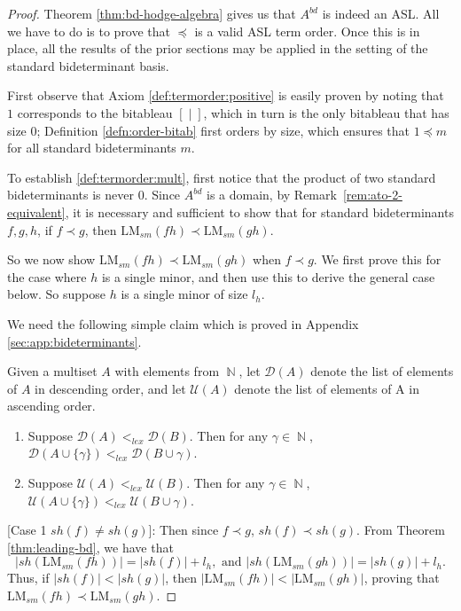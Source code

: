 \documentclass[11pt,reqno]{amsart}
\DeclareMathOperator{\N}{\mathbb{N}}
\newcommand{\bitab}[2]{[#1\;|\;#2]}
\newcommand{\lmsm}{\text{LM}_{sm}}
\newcommand{\shapebitab}{sh}
\newcommand{\sizetab}[1]{|#1|}
\theoremstyle{definition}
\numberwithin{equation}{section}
\begin{document}
\begin{proof}
Theorem \ref{thm:bd-hodge-algebra} gives us that $A^{bd}$ is indeed an ASL. All we have to do is to prove that $\preceq$ is a valid ASL term order. Once this is in place, all the results of the prior sections may be applied in the setting of the standard bideterminant basis.

First observe that Axiom \ref{def:termorder:positive} is easily proven by noting that $1$ corresponds to the bitableau $\bitab{}{}$, which in turn is the only bitableau that has size $0$; Definition \ref{defn:order-bitab} first orders by size, which ensures that $1 \preceq m$ for all standard bideterminants $m$.

To establish \ref{def:termorder:mult}, first notice that the product of two standard bideterminants is never $0$. Since $A^{bd}$ is a domain, by Remark~\ref{rem:ato-2-equivalent}, it is necessary and sufficient to show that for standard bideterminants $f, g, h$, if $f \prec g$, then $\lmsm(fh) \prec \lmsm(gh)$.

So we now show $\lmsm(fh) \prec \lmsm(gh)$ when $f \prec g$. We first prove this for the case where $h$ is a single minor, and then use this to derive the general case below. So suppose $h$ is a single minor of size $l_h$. 

We need the following simple claim which is proved in Appendix \ref{sec:app:bideterminants}.

\begin{claim}[store=claimlexicographicunion]
\label{claim:lexicographic-union}
Given a multiset $A$ with elements from $\N$, let $\mathcal{D}(A)$ denote the list of elements of $A$ in descending order, and let $\mathcal{U}(A)$ denote the list of elements of A in ascending order.
\begin{enumerate}[label=(\Roman*),ref=(\Roman*),itemindent=-10pt]
\item \label{point:descending} Suppose $\mathcal{D}(A) <_{lex} \mathcal{D}(B)$. Then for any $\gamma \in \N$, $\mathcal{D}(A \cup \{\gamma\}) <_{lex} \mathcal{D}(B \cup \gamma)$.
\item \label{point:ascending} Suppose $\mathcal{U}(A) <_{lex} \mathcal{U}(B)$. Then for any $\gamma \in \N$, $\mathcal{U}(A \cup \{\gamma\}) <_{lex} \mathcal{U}(B \cup \gamma)$.
\end{enumerate}

\end{claim}

[Case 1 $\shapebitab(f) \neq \shapebitab(g)$]: Then since $f \prec g$, $\shapebitab(f) \prec \shapebitab(g)$. From Theorem \ref{thm:leading-bd}, we have that 
\[ \sizetab{\shapebitab(\lmsm(fh))} = \sizetab{\shapebitab(f)} + l_h, \text{ and }\sizetab{\shapebitab(\lmsm(gh))} = \sizetab{\shapebitab(g)} + l_h.\] Thus, if $\sizetab{\shapebitab(f)} < \sizetab{\shapebitab(g)}$, then $\sizetab{\lmsm(fh)} < \sizetab{\lmsm(gh)}$, proving that $\lmsm(fh) \prec \lmsm(gh)$. 


\end{proof}
\end{document}
